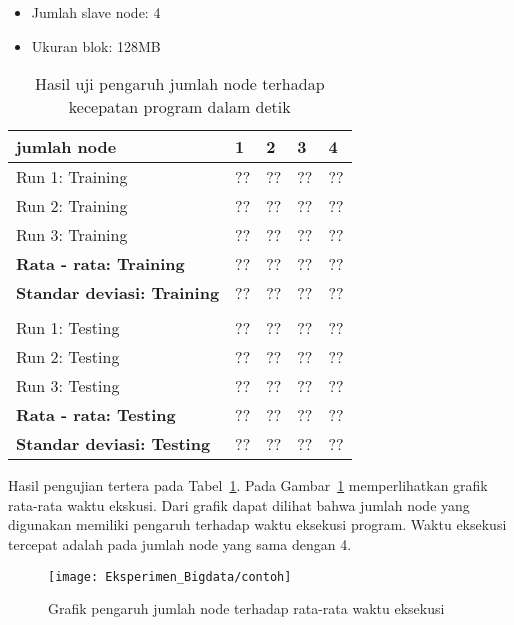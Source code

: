 \begin{itemize}
	\item Jumlah slave node: 4
	\item Ukuran blok: 128MB
\end{itemize}

\begin{table}[H]
\label{tab:uji pengaruh jumlah node}
\centering
\caption{Hasil uji pengaruh jumlah node terhadap kecepatan program dalam detik}
\begin{tabular}{ | l | l | l | l | l | }
\hline
jumlah node & 1 & 2 & 3 & 4 \\ \hline \hline
Run 1: Training & ?? & ?? & ?? & ?? \\ \hline
Run 2: Training & ?? & ?? & ?? & ?? \\ \hline
Run 3: Training & ?? & ?? & ?? & ?? \\ \hline
\textbf{Rata - rata: Training} & ?? & ?? & ?? & ?? \\ \hline
\textbf{Standar deviasi: Training} & ?? & ?? & ?? & ?? \\ \hline
 & & & & \\ \hline
Run 1: Testing & ?? & ?? & ?? & ?? \\ \hline
Run 2: Testing & ?? & ?? & ?? & ?? \\ \hline
Run 3: Testing & ?? & ?? & ?? & ?? \\ \hline
\textbf{Rata - rata: Testing} & ?? & ?? & ?? & ?? \\ \hline
\textbf{Standar deviasi: Testing} & ?? & ?? & ?? & ?? \\ \hline
\end{tabular}
\end{table}

Hasil pengujian tertera pada Tabel~\ref{tab:uji pengaruh jumlah node}. Pada Gambar~\ref{fig:Grafik pengaruh jumlah node terhadap rata-rata waktu eksekusi} memperlihatkan grafik rata-rata waktu ekskusi. Dari grafik dapat dilihat bahwa jumlah node yang digunakan memiliki pengaruh terhadap waktu eksekusi program. Waktu eksekusi tercepat adalah pada jumlah node yang sama dengan 4.

\begin{figure}[H]
	\centering
	\texttt{[image: Eksperimen\_Bigdata/contoh]}
	\caption[Grafik pengaruh jumlah node terhadap rata-rata waktu eksekusi]{Grafik pengaruh jumlah node terhadap rata-rata waktu eksekusi}
	\label{fig:Grafik pengaruh jumlah node terhadap rata-rata waktu eksekusi}
\end{figure}

